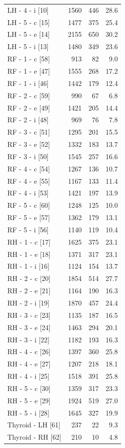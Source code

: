 \documentclass[a4paper,11pt]{article}
\begin{document}
\begin{small}
\begin{longtable}{p{5cm}rrr}
LH - 4 - i [10] & 1560 & 446 & 28.6 \\
LH - 5 - c [15] & 1477 & 375 & 25.4 \\
LH - 5 - e [14] & 2155 & 650 & 30.2 \\
LH - 5 - i [13] & 1480 & 349 & 23.6 \\
RF - 1 - c [58] & 913 & 82 & 9.0 \\
RF - 1 - e [47] & 1555 & 268 & 17.2 \\
RF - 1 - i [46] & 1442 & 179 & 12.4 \\
RF - 2 - c [59] & 990 & 67 & 6.8 \\
RF - 2 - e [49] & 1421 & 205 & 14.4 \\
RF - 2 - i [48] & 969 & 76 & 7.8 \\
RF - 3 - c [51] & 1295 & 201 & 15.5 \\
RF - 3 - e [52] & 1332 & 183 & 13.7 \\
RF - 3 - i [50] & 1545 & 257 & 16.6 \\
RF - 4 - c [54] & 1267 & 136 & 10.7 \\
RF - 4 - e [55] & 1167 & 133 & 11.4 \\
RF - 4 - i [53] & 1421 & 197 & 13.9 \\
RF - 5 - c [60] & 1248 & 125 & 10.0 \\
RF - 5 - e [57] & 1362 & 179 & 13.1 \\
RF - 5 - i [56] & 1140 & 119 & 10.4 \\
RH - 1 - c [17] & 1625 & 375 & 23.1 \\
RH - 1 - e [18] & 1371 & 317 & 23.1 \\
RH - 1 - i [16] & 1124 & 154 & 13.7 \\
RH - 2 - c [20] & 1854 & 514 & 27.7 \\
RH - 2 - e [21] & 1164 & 190 & 16.3 \\
RH - 2 - i [19] & 1870 & 457 & 24.4 \\
RH - 3 - c [23] & 1135 & 187 & 16.5 \\
RH - 3 - e [24] & 1463 & 294 & 20.1 \\
RH - 3 - i [22] & 1182 & 193 & 16.3 \\
RH - 4 - c [26] & 1397 & 360 & 25.8 \\
RH - 4 - e [27] & 1207 & 218 & 18.1 \\
RH - 4 - i [25] & 1518 & 391 & 25.8 \\
RH - 5 - c [30] & 1359 & 317 & 23.3 \\
RH - 5 - e [29] & 1924 & 519 & 27.0 \\
RH - 5 - i [28] & 1645 & 327 & 19.9 \\
Thyroid - LH [61] & 237 & 22 & 9.3 \\
Thyroid - RH [62] & 210 & 10 & 4.8 \\
\end{longtable}
\end{small}
\end{document}
